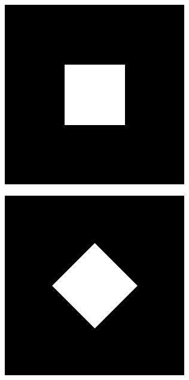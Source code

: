 \begin{figure}[htbp]
  \centering
  \begin{subfigure}[b]{0.2\textwidth}
    \centering
    \includegraphics[width=\textwidth]{figs/fourier/square_original.png}
    \vspace*{0.02\textwidth}
  \end{subfigure}%
  \hspace*{0.02\textwidth}
  \begin{subfigure}[b]{0.2\textwidth}
    \centering
    \includegraphics[width=\textwidth]{figs/fourier/square_45deg_original.png}

\end{subfigure}
\end{figure}
